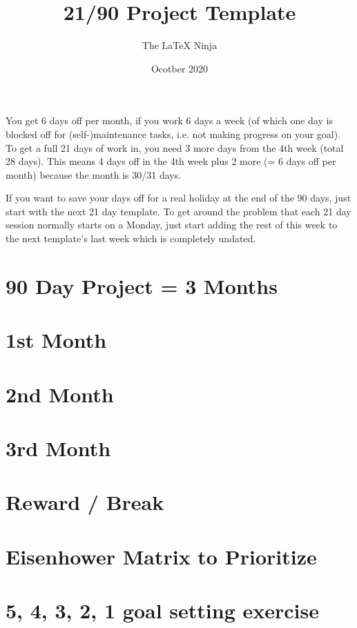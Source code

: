 \documentclass[9pt]{article}
\title{21/90 Project Template}
\author{The \LaTeX{} Ninja}
\date{Ocotber 2020}
\begin{document}


\newpage 


\twentyonedayprojectOneMonth
\newpage 

\twentyonedayprojectOneMonth
\newpage 

\twentyonedayprojectOneMonth

You get 6 days off per month, if you work 6 days a week (of which one day is blocked off for (self-)maintenance tasks, i.e. not making progress on your goal). To get a full 21 days of work in, you need 3 more days from the 4th week (total 28 days). This means 4 days off in the 4th week plus 2 more (= 6 days off per month) because the month is  30/31 days.  

If you want to save your days off for a real holiday at the end of the 90 days, just start with the next 21 day template. To get around the problem that each 21 day session normally starts on a Monday, just start adding the rest of this week to the next template's last week which is completely undated.

\newpage 

\section{90 Day Project = 3 Months}

\reviewboxes
\vspace{3em}

\ninetydayproject
\vspace{1em}

\newpage 
\section{1st Month}

\section{2nd Month}

\section{3rd Month}

\section{Reward / Break}

\section{Eisenhower Matrix to Prioritize}
\eisenhower

\section{5, 4, 3, 2, 1 goal setting exercise}
\fiveFourThreeTwoOneExercise
\end{document}
